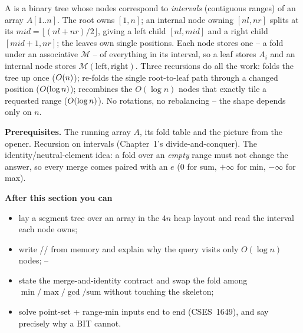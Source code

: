 \begin{topicintro}
A  is a binary tree whose nodes correspond to
\emph{intervals} (contiguous ranges) of an array \(A[1..n]\).  The root owns
\([1,n]\); an internal node owning \([nl,nr]\) splits at its
 \(mid=\lfloor(nl+nr)/2\rfloor\), giving a left child \([nl,mid]\)
and a right child \([mid+1,nr]\); the leaves own single positions.  Each node
stores one  -- a fold under an associative 
\(\mathcal{M}\) -- of everything in its interval, so a leaf stores \(A_i\) and
an internal node stores \(\mathcal{M}(\text{left},\text{right})\).  Three
recursions do all the work:  folds the tree up once
(\(O(n)\));  re-folds the single root-to-leaf path through a
changed position (\(O(\log n)\));  recombines the
\(O(\log n)\) nodes that exactly tile a requested range (\(O(\log n)\)).
No rotations, no rebalancing -- the shape depends only on \(n\).

\textbf{Prerequisites.} The running array \(A\), its fold table and the
 picture from the opener.  Recursion on intervals (Chapter~1's
divide-and-conquer).  The identity/neutral-element idea: a fold over an
\emph{empty} range must not change the answer, so every merge comes paired with
an \(e\) (\(0\) for sum, \(+\infty\) for min, \(-\infty\) for max).

\textbf{After this section you can}
\begin{itemize}[nosep]
  \item lay a segment tree over an array in the \(4n\) heap layout and read
        the interval each node owns; \hfill{}
  \item write // from memory and explain
        why the query visits only \(O(\log n)\) nodes; \hfill{}--
  \item state the merge-and-identity contract and swap the fold among
        \(\min/\max/\gcd/\text{sum}\) without touching the skeleton; \hfill{}
  \item solve point-set + range-min inputs end to end (CSES~1649), and say
        precisely why a BIT cannot. \hfill{}
\end{itemize}
\end{topicintro}

